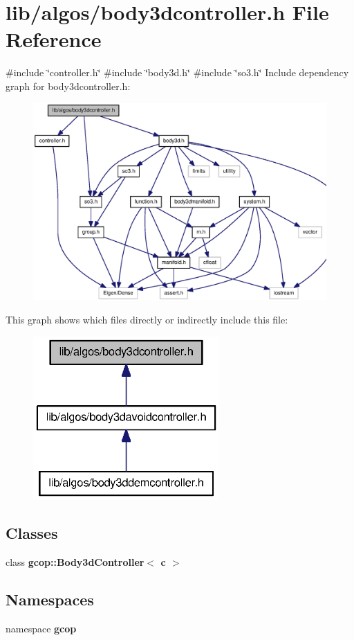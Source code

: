 \section{lib/algos/body3dcontroller.h \-File \-Reference}
\label{body3dcontroller_8h}
{\ttfamily \#include \char`\"{}controller.\-h\char`\"{}}\*
{\ttfamily \#include \char`\"{}body3d.\-h\char`\"{}}\*
{\ttfamily \#include \char`\"{}so3.\-h\char`\"{}}\*
\-Include dependency graph for body3dcontroller.\-h\-:
\nopagebreak
\begin{figure}[H]
\begin{center}
\leavevmode
\includegraphics[width=350pt]{body3dcontroller_8h__incl}
\end{center}
\end{figure}
\-This graph shows which files directly or indirectly include this file\-:
\nopagebreak
\begin{figure}[H]
\begin{center}
\leavevmode
\includegraphics[width=202pt]{body3dcontroller_8h__dep__incl}
\end{center}
\end{figure}
\subsection*{\-Classes}
\begin{DoxyCompactItemize}
\item 
class {\bf gcop\-::\-Body3d\-Controller$<$ c $>$}
\end{DoxyCompactItemize}
\subsection*{\-Namespaces}
\begin{DoxyCompactItemize}
\item 
namespace {\bf gcop}
\end{DoxyCompactItemize}
